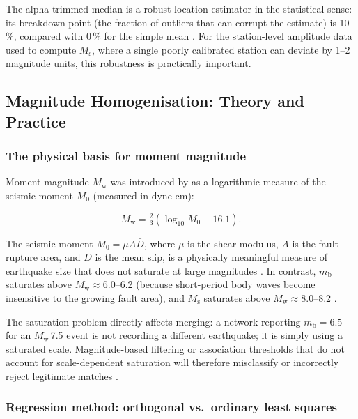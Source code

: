 \documentclass[12pt]{article}
\begin{document}
The alpha-trimmed median is a robust location estimator in the statistical
sense: its breakdown point (the fraction of outliers that can corrupt the
estimate) is 10\,\%, compared with 0\,\% for the simple mean
\citep{Huber1981}.  For the station-level amplitude data used to compute
$M_\mathrm{s}$, where a single poorly calibrated station can deviate by
1--2 magnitude units, this robustness is practically important.

\subsection{Magnitude Homogenisation: Theory and Practice}
\label{sec:maghomog}

\subsubsection{The physical basis for moment magnitude}

Moment magnitude $M_\mathrm{w}$ was introduced by \citet{HanksKanamori1979} as
a logarithmic measure of the seismic moment $M_0$ (measured in dyne-cm):

\begin{equation}
  M_\mathrm{w} = \tfrac{2}{3}(\log_{10} M_0 - 16.1).
  \label{eq:mwdef}
\end{equation}

The seismic moment $M_0 = \mu A \bar{D}$, where $\mu$ is the shear modulus,
$A$ is the fault rupture area, and $\bar{D}$ is the mean slip, is a
physically meaningful measure of earthquake size that does not saturate at
large magnitudes \citep{Kanamori1977}.  In contrast, $m_\mathrm{b}$ saturates
above $M_\mathrm{w} \approx 6.0$--6.2 (because short-period body waves become
insensitive to the growing fault area), and $M_\mathrm{s}$ saturates above
$M_\mathrm{w} \approx 8.0$--8.2 \citep{Bormann2012}.

The saturation problem directly affects merging: a network reporting
$m_\mathrm{b} = 6.5$ for an $M_\mathrm{w}$\,7.5 event is not recording a
different earthquake; it is simply using a saturated scale.  Magnitude-based
filtering or association thresholds that do not account for scale-dependent
saturation will therefore misclassify or incorrectly reject legitimate matches
\citep{Bormann2012, ISCGEM2018}.

\subsubsection{Regression method: orthogonal vs.\ ordinary least squares}
\label{sec:regression}
\end{document}
